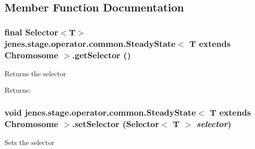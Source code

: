 \subsection{Member Function Documentation}
\hypertarget{classjenes_1_1stage_1_1operator_1_1common_1_1_steady_state_3_01_t_01extends_01_chromosome_01_4_c9493ab808eed1e19961d6ba1b97b52d}{
\subsubsection[getSelector]{\setlength{\rightskip}{0pt plus 5cm}final Selector$<$T$>$ jenes.stage.operator.common.SteadyState$<$ T extends Chromosome $>$.getSelector ()}}
\label{classjenes_1_1stage_1_1operator_1_1common_1_1_steady_state_3_01_t_01extends_01_chromosome_01_4_c9493ab808eed1e19961d6ba1b97b52d}


Returns the selector

\begin{Desc}
\item[Returns:]\end{Desc}
\hypertarget{classjenes_1_1stage_1_1operator_1_1common_1_1_steady_state_3_01_t_01extends_01_chromosome_01_4_d4c63d6921648fac68ea074d8fb49002}{
\subsubsection[setSelector]{\setlength{\rightskip}{0pt plus 5cm}void jenes.stage.operator.common.SteadyState$<$ T extends Chromosome $>$.setSelector (Selector$<$ T $>$ {\em selector})}}
\label{classjenes_1_1stage_1_1operator_1_1common_1_1_steady_state_3_01_t_01extends_01_chromosome_01_4_d4c63d6921648fac68ea074d8fb49002}


Sets the selector

